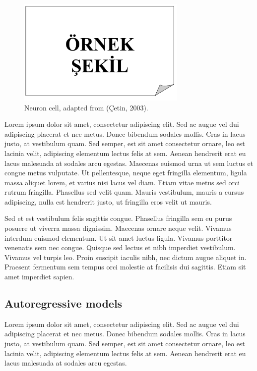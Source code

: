 \begin{figure}
	\centering
	\includegraphics[width=230pt,keepaspectratio=true]{./fig/sekil3}
	\caption{Neuron cell, adapted from (\c{C}etin, 2003).}
	\label{fig:3-1-1}
\end{figure}

Lorem ipsum dolor sit amet, consectetur adipiscing elit. Sed ac augue vel dui 
adipiscing placerat et nec metus. Donec bibendum sodales mollis. Cras in lacus 
justo, at vestibulum quam. Sed semper, est sit amet consectetur ornare, leo est 
lacinia velit, adipiscing elementum lectus felis at sem. Aenean hendrerit erat eu 
lacus malesuada at sodales arcu egestas. Maecenas euismod urna ut sem luctus et 
congue metus vulputate. Ut pellentesque, neque eget fringilla elementum, ligula 
massa aliquet lorem, et varius nisi lacus vel diam. Etiam vitae metus sed orci 
rutrum fringilla. Phasellus sed velit quam. Mauris vestibulum, mauris a cursus 
adipiscing, nulla est hendrerit justo, ut fringilla eros velit ut mauris.

Sed et est vestibulum felis sagittis congue. Phasellus fringilla sem eu purus 
posuere ut viverra massa dignissim. Maecenas ornare neque velit. Vivamus interdum 
euismod elementum. Ut sit amet luctus ligula. Vivamus porttitor venenatis sem nec 
congue. Quisque sed lectus et nibh imperdiet vestibulum. Vivamus vel turpis leo. 
Proin suscipit iaculis nibh, nec dictum augue aliquet in. Praesent fermentum sem 
tempus orci molestie at facilisis dui sagittis. Etiam sit amet imperdiet sapien.

\subsection{Autoregressive models}

Lorem ipsum dolor sit amet, consectetur adipiscing elit. Sed ac augue vel dui 
adipiscing placerat et nec metus. Donec bibendum sodales mollis. Cras in lacus 
justo, at vestibulum quam. Sed semper, est sit amet consectetur ornare, leo est 
lacinia velit, adipiscing elementum lectus felis at sem. Aenean hendrerit erat eu 
lacus malesuada at sodales arcu egestas. 

